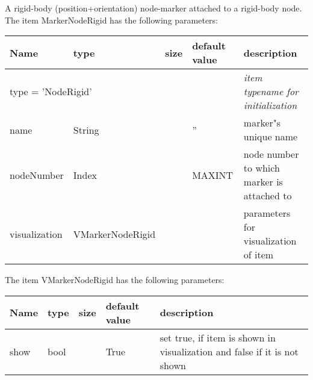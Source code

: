 A rigid-body (position+orientation) node-marker attached to a rigid-body node.
 \\The item MarkerNodeRigid has the following parameters:
\begin{center}
  \footnotesize
  \begin{longtable}{| p{4.5cm} | p{2.5cm} | p{0.5cm} | p{2.5cm} | p{6cm} |}
    \hline
    \bf Name & \bf type & \bf size & \bf default value & \bf description \\ \hline
    \multicolumn{4}{l}{\parbox{10cm}{type = 'NodeRigid'}} & \multicolumn{1}{l}{\parbox{6cm}{\it item typename for initialization}}\\ \hline
    name &     String &      &     '' &     marker"s unique name\\ \hline
    nodeNumber &     Index &      &     MAXINT &     node number to which marker is attached to\\ \hline
    visualization & VMarkerNodeRigid & & & parameters for visualization of item \\ \hline
	  \end{longtable}
	\end{center}
The item VMarkerNodeRigid has the following parameters:
\begin{center}
  \footnotesize
  \begin{longtable}{| p{4.5cm} | p{2.5cm} | p{0.5cm} | p{2.5cm} | p{6cm} |}
    \hline
    \bf Name & \bf type & \bf size & \bf default value & \bf description \\ \hline
    show &     bool &      &     True &     set true, if item is shown in visualization and false if it is not shown\\ \hline
	  \end{longtable}
	\end{center}


